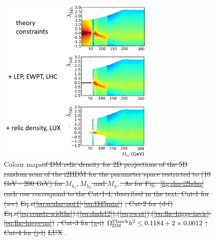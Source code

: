 \documentclass[12pt,a4paper]{article}
\providecommand{\DIFdeltex}[1]{{\protect\color{red}\sout{#1}}}                      %
\providecommand{\DIFdelFL}[1]{\DIFdel{#1}} %
\providecommand{\DIFaddbeginFL}{} %
\providecommand{\DIFaddendFL}{} %
\providecommand{\DIFdelbeginFL}{} %
\providecommand{\DIFdelendFL}{} %
\providecommand{\DIFdel}[1]{\texorpdfstring{\DIFdeltex{#1}}{}} %
\begin{document}
\begin{figure}[htb]
\begin{center}
\includegraphics[width=0.7\textwidth]{simplified.jpg}
\DIFaddendFL \caption{Colour maps\DIFdelbeginFL \DIFdelFL{of DM relic density for 2D projections of the 5D random scan of the
i2HDM for the parameter space restricted to (10 GeV - 200 GeV) for $M_{h_1},M_{h_2}$ and
$M_{h^{+}}$. As for Fig.~\ref{fig:dm-i2hdm} each row correspond to the Cut-1-4, described in the text: Cut-1 for (a-c) }%
\DIFdelFL{Eq}\DIFdelendFL .\DIFdelbeginFL \DIFdelFL{s(\ref{eq:scalar-pot1}-\ref{eq:l345min})}%
\DIFdelFL{; Cut-2 for (d-f) }%
\DIFdelFL{Eq}\DIFdelendFL .\DIFdelbeginFL \DIFdelFL{s(\ref{eq:constr-widths}),(\ref{eq:dmh12}),(\ref{eq:ewpt}),(\ref{eq:lhc-higgs-invis}-\ref{eq:lhc-higgs-aa})}%
\DIFdelFL{; Cut-3 for (g-i) }%
\DIFdelFL{$\Omega_{\rm DM}^{\rm Planck} h^2 \le 0.1184+2\times 0.0012$}%
\DIFdelFL{; Cut-4 for (j-l) }%
\DIFdelFL{LUX}%
\DIFdelendFL . \DIFdelbeginFL %
\DIFdelendFL \DIFaddbeginFL \label{fig:scan-simplified}\DIFaddendFL } 
\DIFaddbeginFL \end{center}
\DIFaddendFL \end{figure}
\end{document}

